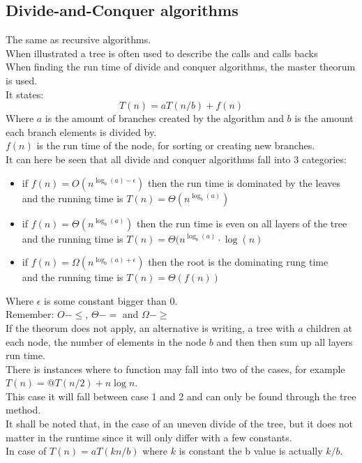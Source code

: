 \documentclass[12pt, a4paper]{article}
\begin{document}
			\subsection{Divide-and-Conquer algorithms}
				The same as recursive algorithms.\\
				When illustrated a tree is often used to describe the calls and calls backs\\
				When finding the run time of divide and conquer algorithms, the master theorum is used.\\
				It states:
				$$T(n)=aT(n/b)+f(n)$$
				Where $a$ is the amount of branches created by the algorithm and $b$ is the amount each branch elements is divided by.\\
				$f(n)$ is the run time of the node, for sorting or creating new branches.\\
				It can here be seen that all divide and conquer algorithms fall into 3 categories:
				\begin{itemize}
					\item if $f(n)=O(n^{\log_b(a)-\epsilon})$ then the run time is dominated by the leaves\\
							  and the running time is $T(n)=\Theta(n^{\log_b(a)})$
					\item if $f(n)=\Theta(n^{\log_b(a)})$ then the run time is even on all layers of the tree\\
						and the running time is $T(n)=\Theta(n^{\log_b(a)}\cdot \log(n)$
			 		\item if $f(n)=\Omega(n^{\log_b(a)+\epsilon})$ then the root is the dominating rung time\\
							  and the running time is $T(n)=\Theta(f(n))$
				\end{itemize}
				Where $\epsilon$ is some constant bigger than 0.\\
				Remember: $O - \leq$, $\Theta - =$ and $\Omega - \geq$\\
				If the theorum does not apply, an alternative is writing, a tree with $a$ children at each node, the number of elements in the node $b$ and then then sum up all layers run time.\\[4mm]
				There is instances where to function may fall into two of the cases, for example $T(n)=@T(n/2)+n\log n$.\\
				This case it will fall between case 1 and 2 and can only be found through the tree method.\\
				It shall be noted that, in the case of an uneven divide of the tree, but it does not matter in the runtime since it will only differ with a few constants.\\
				In case of $T(n)=aT(kn/b)$ where $k$ is constant the b value is actually $k/b$.
\end{document}
